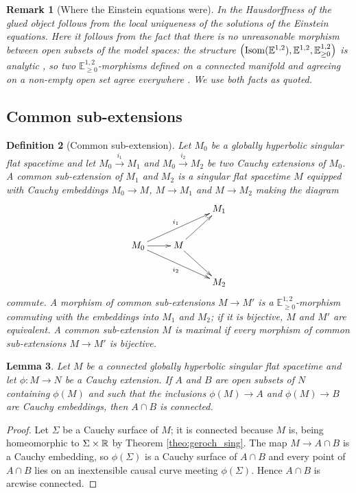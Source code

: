\documentclass[a4paper,twoside]{article}
\newcommand{\mass}[1]{\mathbb{E}^{1,2}_{#1}}
\newtheorem{lem}{Lemma}[section]
\newtheorem{defi}[lem]{Definition}
\newtheorem{rem}[lem]{Remark}
\begin{document}
\begin{rem}[Where the Einstein equations were]\label{rem:CBG_analytique}
In \cite{MR0250640} the Hausdorffness of the glued object follows from the local uniqueness of the
solutions of the Einstein equations. Here it follows from the fact that there is no unreasonable
morphism between open subsets of the model spaces: the structure
$\left(\isom(\mass{}),\mass{},\mass{\geq0}\right)$ is analytic \cite[Prop.~2.3.14]{thesis}, so two
$\mass{\geq0}$-morphisms defined on a connected manifold and agreeing on a non-empty open set agree
everywhere \cite[Prop.~1.2.11]{thesis}. We use both facts as quoted.
\end{rem}

\subsection{Common sub-extensions}\label{subsec:CBG_pgcd}

\begin{defi}[Common sub-extension]\label{def:common_sub_extension}
Let $M_0$ be a globally hyperbolic singular flat spacetime and let $M_0\xrightarrow{i_1} M_1$ and
$M_0\xrightarrow{i_2} M_2$ be two Cauchy extensions of $M_0$. A \emph{common sub-extension} of $M_1$
and $M_2$ is a singular flat spacetime $M$ equipped with Cauchy embeddings $M_0\rightarrow M$,
$M\rightarrow M_1$ and $M\rightarrow M_2$ making the diagram
$$
	\xymatrix{
		& &M_1\\
		M_0\ar[urr]^{i_1} \ar[drr]_{i_2}\ar[r]&M\ar[ur]\ar[dr]& \\
		&& M_2
	}
$$
commute. A morphism of common sub-extensions $M\rightarrow M'$ is a $\mass{\geq0}$-morphism
commuting with the embeddings into $M_1$ and $M_2$; if it is bijective, $M$ and $M'$ are
\emph{equivalent}. A common sub-extension $M$ is \emph{maximal} if every morphism of common
sub-extensions $M\rightarrow M'$ is bijective.
\end{defi}

\begin{lem}\label{lem:C_ext_connexe}
Let $M$ be a connected globally hyperbolic singular flat spacetime and let $\phi:M\rightarrow N$ be a
Cauchy extension. If $A$ and $B$ are open subsets of $N$ containing $\phi(M)$ and such that the
inclusions $\phi(M)\rightarrow A$ and $\phi(M)\rightarrow B$ are Cauchy embeddings, then $A\cap B$ is
connected.
\end{lem}
\begin{proof}
Let $\Sigma$ be a Cauchy surface of $M$; it is connected because $M$ is, being homeomorphic to
$\Sigma\times \mathbb R$ by Theorem \ref{theo:geroch_sing}. The map $M\rightarrow A\cap B$ is a Cauchy
embedding, so $\phi(\Sigma)$ is a Cauchy surface of $A\cap B$ and every point of $A\cap B$ lies on an
inextensible causal curve meeting $\phi(\Sigma)$. Hence $A\cap B$ is arcwise connected.
\end{proof}
\end{document}
